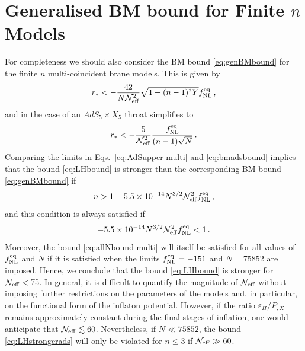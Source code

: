 \section{Generalised BM bound for Finite \texorpdfstring{$n$}{n} Models}
\label{sec:apx-genbmbound}


For completeness we should also consider the 
BM bound \eqref{eq:genBMbound} for the finite $n$ multi-coincident brane models. This is
given by 
% 
\begin{equation}
\label{eq:BMAdS-multi}
r_* < -\frac{42}{N \mathcal{N}_\mathrm{eff}^2}\sqrt{1 +(n-1)^2Y}f_{\mathrm{NL}}^{\mathrm{eq}} \,,
\end{equation}
%  
and in the case of an $AdS_5 \times X_5$ throat simplifies to
%  
\begin{equation}
\label{eq:bmadsbound}
r_* < -\frac{5}{\mathcal{N}_\mathrm{eff}^2} 
\frac{f_{\mathrm{NL}}^{\mathrm{eq}}}{(n-1)\sqrt{N}} \,.
\end{equation}
%  
Comparing the limits in Eqs.~\eqref{eq:AdSupper-multi} and
\eqref{eq:bmadsbound} 
implies that the bound \eqref{eq:LHbound} is stronger than the corresponding BM
bound \eqref{eq:genBMbound} if 
% 
\begin{equation}
\label{eq:LHstrongerads}
n > 1 -5.5 \times 10^{-14} N^{3/2} \mathcal{N}_\mathrm{eff}^2 f_{\mathrm{NL}}^{\mathrm{eq}} \,,
\end{equation}
% 
and this condition is always satisfied if 
% 
\begin{equation}
\label{eq:allNbound-multi}
-5.5 \times 10^{-14} N^{3/2} \mathcal{N}_\mathrm{eff}^2 f_{\mathrm{NL}}^{\mathrm{eq}}  <1  \, .
\end{equation}
% 
Moreover, the bound \eqref{eq:allNbound-multi} will itself be satisfied for 
all values of $f_{\mathrm{NL}}^{\mathrm{eq}}$ and $N$ if it is satisfied when the limits 
$f_{\mathrm{NL}}^{\mathrm{eq}} =-151$ and $N=75852$ are imposed. Hence, we conclude that the bound
\eqref{eq:LHbound} 
is stronger for $\mathcal{N}_\mathrm{eff} < 75$. 
In general, it is difficult to quantify 
the magnitude of $\mathcal{N}_\mathrm{eff}$ without 
imposing further restrictions on the parameters of the models 
and, in particular, on the functional form of the inflaton potential. 
However, if the ratio $\varepsilon_H/P_{,X}$ remains approximately 
constant during the final stages of inflation, one would anticipate that 
$\mathcal{N}_\mathrm{eff} \lesssim 60$. Nevertheless, if $N \ll 75852$, the bound 
\eqref{eq:LHstrongerads} will only be violated for $n \le 3$ if 
$\mathcal{N}_\mathrm{eff} \gg 60$.

